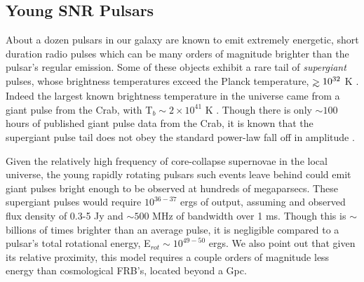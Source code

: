 \documentclass[useAMS,usenatbib]{mn2e}
\def\gtrsim{\mathrel{\hbox{\rlap{\hbox{\lower4pt\hbox{$\sim$}}}\hbox{$>$}}}}
\begin{document}
\subsection{Young SNR Pulsars}

About a dozen pulsars in our galaxy are known to emit extremely energetic,
short duration radio pulses which can be many orders of magnitude 
brighter than the pulsar's regular emission. Some of these objects exhibit 
a rare tail of \textit{supergiant} pulses, whose brightness temperatures 
exceed the Planck temperature, $\gtrsim10^{32}$ K \citep{2004ApJ...612..375C}.
Indeed the largest
known brightness temperature in the universe came from a giant pulse from the Crab,
 with T$_b\sim2\times10^{41}$ K \citep{2014ApJ...792..135T}. Though there
is only $\sim100$ hours of published giant pulse data from the Crab, it is known
that the supergiant pulse tail does not obey the standard power-law fall off
in amplitude \citep{2012ApJ...760...64M}.

Given the relatively high frequency of core-collapse supernovae 
in the local universe, the young 
rapidly rotating pulsars such events leave behind could emit giant 
pulses bright enough to be observed at hundreds of megaparsecs. 
These supergiant pulses would require $10^{36 - 37}$ ergs of output,
assuming and observed flux density of 0.3-5 Jy and $\sim500$ 
MHz of bandwidth over 1 ms. Though this is $\sim$ billions of times
brighter than an average pulse, it is negligible compared to a 
pulsar's total rotational energy, E$_{rot} \sim 10^{49-50}$ ergs. We
also point out that given its relative proximity, this model requires
a couple orders of magnitude less energy than cosmological FRB's,
located beyond a Gpc. 

\end{document}
